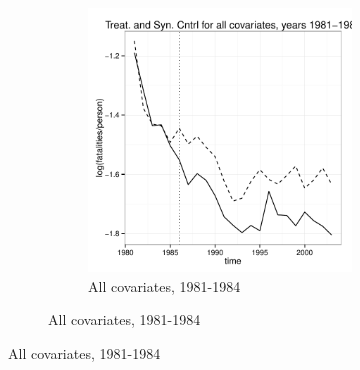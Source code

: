 \documentclass[letterpaper, 12pt]{article}
\begin{document}
\begin{figure}
\begin{centering}
\begin{figure}
\begin{centering}
    \begin{subfigure}[b]{\textwidth}
      \includegraphics{img-split-full1984.pdf}
      \caption{All covariates, 1981-1984}
      \label{fig:c12b}
    \end{subfigure}


\end{centering}
\end{figure}
\end{centering}
\end{figure}
\end{document}
